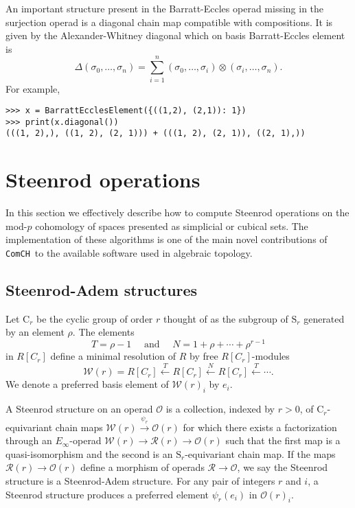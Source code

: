 \documentclass{amsart}
\renewcommand{\S}{\mathrm S}
\newcommand{\comch}{\texttt{ComCH}}
\begin{document}
An important structure present in the Barratt-Eccles operad missing in the surjection operad is a diagonal chain map compatible with compositions. It is given by the Alexander-Whitney diagonal which on basis Barratt-Eccles element is
\begin{equation*}
\Delta(\sigma_0, \dots, \sigma_n) = \sum_{i=1}^n (\sigma_0, \dots, \sigma_i) \otimes (\sigma_i, \dots, \sigma_n).
\end{equation*}
For example,
\begin{Verbatim}[frame=single, samepage=true]
>>> x = BarrattEcclesElement({((1,2), (2,1)): 1})
>>> print(x.diagonal())
(((1, 2),), ((1, 2), (2, 1))) + (((1, 2), (2, 1)), ((2, 1),))
\end{Verbatim}

\section{Steenrod operations} \label{s: steenrod operations}

In this section we effectively describe how to compute Steenrod operations on the mod-$p$ cohomology of spaces presented as simplicial or cubical sets. The implementation of these algorithms is one of the main novel contributions of \comch\, to the available software used in algebraic topology.

\subsection{Steenrod-Adem structures}

Let $\mathrm{C}_r$ be the cyclic group of order $r$ thought of as the subgroup of $\mathrm{S}_r$ generated by an element $\rho$. The elements
\begin{equation*}
T = \rho-1 \quad \text{ and } \quad N = 1+\rho+\cdots+\rho^{r-1}
\end{equation*}
in $R[C_r]$ define a minimal resolution of $R$ by free $R[C_r]$-modules
\begin{equation*}
\mathcal W(r) = R[C_r] \stackrel{T}{\longleftarrow} R[C_r] \stackrel{N}{\longleftarrow} R[C_r] \stackrel{T}{\longleftarrow} \cdots.
\end{equation*}
We denote a preferred basis element of $\mathcal W(r)_i$ by $e_i$.

A Steenrod structure on an operad $\mathcal O$ is a collection, indexed by $r > 0$, of $\mathrm C_r$-equivariant chain maps $\mathcal W(r) \stackrel{\psi_r}{\longrightarrow} \mathcal O(r)$ for which there exists a factorization through an $E_\infty$-operad $\mathcal W(r) \to \mathcal R(r) \to \mathcal O(r)$ such that the first map is a quasi-isomorphism and the second is an $\S_r$-equivariant chain map. If the maps $\mathcal R(r) \to \mathcal O(r)$ define a morphism of operads $\mathcal R \to \mathcal O$, we say the Steenrod structure is a Steenrod-Adem structure.
For any pair of integers $r$ and $i$, a Steenrod structure produces a preferred element $\psi_r(e_i)$ in $\mathcal O(r)_i$.
\end{document}
